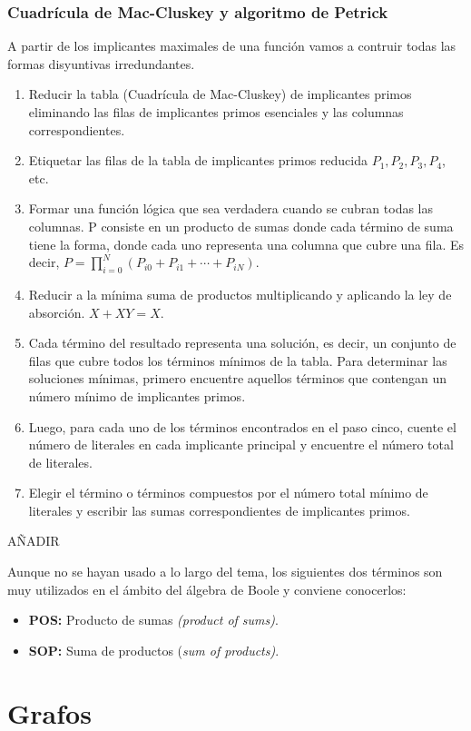 \subsubsection{Cuadrícula de Mac-Cluskey y algoritmo de Petrick}
A partir de los implicantes maximales de una función vamos a contruir todas las formas disyuntivas irredundantes.
\begin{enumerate}
    \item Reducir la tabla (Cuadrícula de Mac-Cluskey) de implicantes primos eliminando las filas de implicantes primos esenciales y las columnas correspondientes.
    \item Etiquetar las filas de la tabla de implicantes primos reducida $P_ {1}, P_ {2}, P_ {3}, P_ {4}$, etc.
    \item Formar una función lógica que sea verdadera cuando se cubran todas las columnas. P consiste en un producto de sumas donde cada término de suma tiene la forma, donde cada uno representa una columna que cubre una fila. Es decir, $P = \prod_{i=0}^N(P _ {{i0}} + P _ {{i1}} +\cdots + P _ {{iN}})$.
    \item Reducir a la mínima suma de productos multiplicando y aplicando la ley de absorción. $X + XY = X$.
    \item Cada término del resultado representa una solución, es decir, un conjunto de filas que cubre todos los términos mínimos de la tabla. Para determinar las soluciones mínimas, primero encuentre aquellos términos que contengan un número mínimo de implicantes primos.
    \item Luego, para cada uno de los términos encontrados en el paso cinco, cuente el número de literales en cada implicante principal y encuentre el número total de literales.
    \item Elegir el término o términos compuestos por el número total mínimo de literales y escribir las sumas correspondientes de implicantes primos.
\end{enumerate}
\begin{ejemplo}
    AÑADIR
\end{ejemplo}
\begin{nota}
    Aunque no se hayan usado a lo largo del tema, los siguientes dos términos son muy utilizados en el ámbito del álgebra de Boole y conviene conocerlos:
    \begin{itemize}
        \item \textbf{POS:} Producto de sumas \textit{(product of sums)}.
        \item \textbf{SOP:} Suma de productos (\textit{sum of products)}.
    \end{itemize}
\end{nota}

\newpage
\section{Grafos}